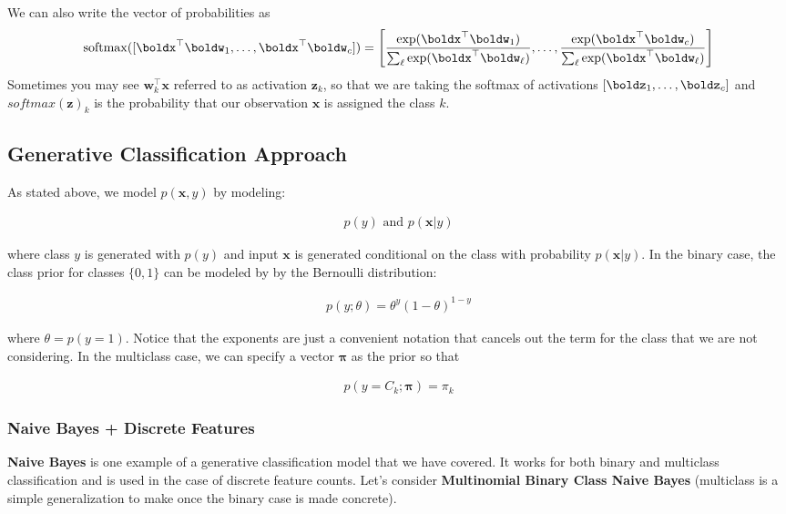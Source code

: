 \documentclass[12pt,letterpaper]{article}
\newcommand{\1}{\mathbbm{1}}
\newcommand{\on}{\operatorname}
\begin{document}
\noindent
We can also write the vector of probabilities as
\begin{align}
\on{softmax}([\boldx^\top \boldw_1, \ldots, \boldx^\top \boldw_c]) = \left[\frac{\exp(\boldx^\top \boldw_1  )}{\sum_{\ell} \exp(\boldx^\top \boldw_{\ell})}, \ldots, \frac{\exp(\boldx^\top \boldw_c  )}{\sum_{\ell} \exp(\boldx^\top \boldw_{\ell})} \right]
\end{align}
Sometimes you may see $\mathbf{w}_k^\top\mathbf{x}$ referred to as activation $\mathbf{z}_k$, so that we are taking the softmax of activations $[\boldz_1, \ldots, \boldz_c]$ and $softmax(\mathbf{z})_k$ is the probability that our observation $\mathbf{x}$ is assigned the class $k$.

\subsection{Generative Classification Approach}

As stated above, we model $p(\mathbf{x},y)$ by modeling:

\begin{align}
p(y) \textrm{ and } p(\mathbf{x}|y)
\end{align}

\noindent
where class $y$ is generated with $p(y)$ and input $\mathbf{x}$ is generated conditional on the class with probability $p(\mathbf{x} | y)$. In the binary case, the class prior for classes $\{0,1\}$ can be modeled by by the Bernoulli distribution:

\begin{align}
p(y;\theta) = \theta^y(1 - \theta)^{1 - y}
\end{align}

\noindent 
where $\theta = p(y = 1)$. Notice that the exponents are just a convenient notation that cancels out the term for the class that we are not considering. In the multiclass case, we can specify a vector $\boldsymbol{\pi}$ as the prior so that

\begin{align}
p(y = C_k ; \boldsymbol{\pi}) = \pi_k
\end{align}


\subsubsection{Naive Bayes + Discrete Features}

\noindent 
\textbf{Naive Bayes} is one example of a generative classification model that we have covered. It works for both binary and multiclass classification and is used in the case of discrete feature counts. Let's consider \textbf{Multinomial Binary Class Naive Bayes} (multiclass is a simple generalization to make once the binary case is made concrete). \\
\end{document}
